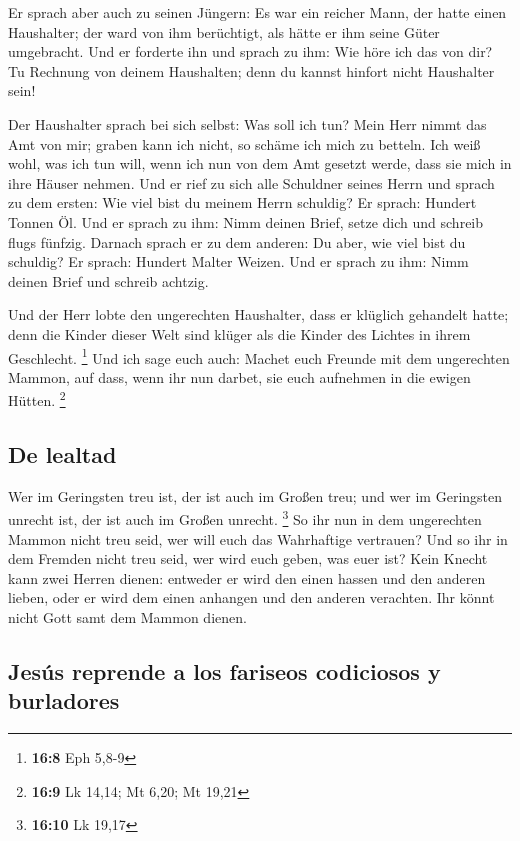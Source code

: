  Er sprach aber auch zu seinen Jüngern: Es war ein reicher
Mann, der hatte einen Haushalter; der ward von ihm berüchtigt, als hätte
er ihm seine Güter umgebracht.  Und er forderte ihn und
sprach zu ihm: Wie höre ich das von dir? Tu Rechnung von deinem
Haushalten; denn du kannst hinfort nicht Haushalter sein!

 Der Haushalter sprach bei sich selbst: Was soll ich tun?
Mein Herr nimmt das Amt von mir; graben kann ich nicht, so schäme ich
mich zu betteln.  Ich weiß wohl, was ich tun will, wenn
ich nun von dem Amt gesetzt werde, dass sie mich in ihre Häuser nehmen.
 Und er rief zu sich alle Schuldner seines Herrn und
sprach zu dem ersten: Wie viel bist du meinem Herrn schuldig?
 Er sprach: Hundert Tonnen Öl. Und er sprach zu ihm: Nimm
deinen Brief, setze dich und schreib flugs fünfzig. 
Darnach sprach er zu dem anderen: Du aber, wie viel bist du schuldig? Er
sprach: Hundert Malter Weizen. Und er sprach zu ihm: Nimm deinen Brief
und schreib achtzig.

 Und der Herr lobte den ungerechten Haushalter, dass er
klüglich gehandelt hatte; denn die Kinder dieser Welt sind klüger als
die Kinder des Lichtes in ihrem Geschlecht. \footnote{\textbf{16:8} Eph
  5,8-9}  Und ich sage euch auch: Machet euch Freunde mit
dem ungerechten Mammon, auf dass, wenn ihr nun darbet, sie euch
aufnehmen in die ewigen Hütten. \footnote{\textbf{16:9} Lk 14,14; Mt
  6,20; Mt 19,21}

\hypertarget{de-lealtad}{%
\subsection{De lealtad}\label{de-lealtad}}

 Wer im Geringsten treu ist, der ist auch im Großen treu;
und wer im Geringsten unrecht ist, der ist auch im Großen unrecht.
\footnote{\textbf{16:10} Lk 19,17}  So ihr nun in dem
ungerechten Mammon nicht treu seid, wer will euch das Wahrhaftige
vertrauen?  Und so ihr in dem Fremden nicht treu seid,
wer wird euch geben, was euer ist?  Kein Knecht kann zwei
Herren dienen: entweder er wird den einen hassen und den anderen lieben,
oder er wird dem einen anhangen und den anderen verachten. Ihr könnt
nicht Gott samt dem Mammon dienen.

\hypertarget{jesuxfas-reprende-a-los-fariseos-codiciosos-y-burladores}{%
\subsection{Jesús reprende a los fariseos codiciosos y
burladores}\label{jesuxfas-reprende-a-los-fariseos-codiciosos-y-burladores}}


